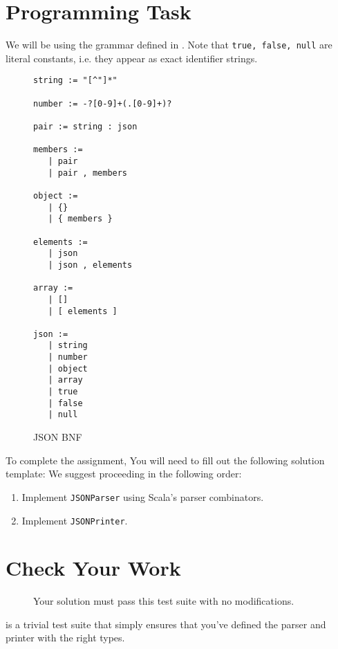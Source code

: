 \section{Programming Task}
We will be using the grammar defined in . Note that
\texttt{true, false, null} are literal constants, i.e. they appear as exact
identifier strings.
\begin{figure}
\begin{verbatim}
string := "[^"]*"

number := -?[0-9]+(.[0-9]+)?

pair := string : json

members :=
   | pair
   | pair , members

object :=
   | {}
   | { members }

elements :=
   | json
   | json , elements

array :=
   | []
   | [ elements ]

json :=
   | string
   | number
   | object
   | array
   | true
   | false
   | null
\end{verbatim}
\caption{JSON BNF}\label{json-bnf}
\end{figure}
To complete the assignment, You will need to fill out the following solution
template:
We suggest proceeding in the following order:
\begin{enumerate}
    \item Implement \lstinline|JSONParser| using Scala's parser combinators.
    \item Implement \lstinline|JSONPrinter|.
\end{enumerate}

\section{Check Your Work}

\begin{figure}
\caption{Your solution must pass this test suite with no modifications.}
\label{parsing_tests}
\end{figure}

 is a trivial test suite that simply ensures that you've
defined the parser and printer with the right types.


